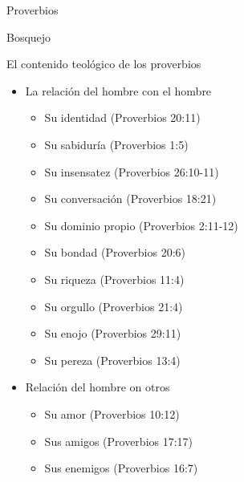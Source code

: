 \begin{section}{Proverbios}
\begin{subsection}{Bosquejo}
\begin{subsubsection}{El contenido teológico de los proverbios}
\begin{itemize}
						\newpage
						También hay una utilidad en estudiar los proverbios de manera temática ya que vemos la relación que el hombre guarda con Dios.\\
						La relación del hombre con Dios
						\begin{itemize}
							\item Su confianza (Proverbios 22:19)
							\item Su humildad (Proverbios 3:34)
							\item Su temor a Dios (Proverbios 1:7)
							\item Su justicia (Proverbios 10:25)
							\item Su pecado (Proverbios 28:13)
							\item Su obediencia (Proverbios 12:15)
							\item Enfrentando recompensa (Proverbios 11:31)
							\item Enfrentado pruebas (Proverbios 17:3)
							\item Enfrentando bendición (Proverbios 10:22)
							\item Enfrentando la muerte (Proverbios 15:11)
						\end{itemize}
					\item La relación del hombre con el hombre
						\begin{itemize}
							\item Su identidad (Proverbios 20:11)
							\item Su sabiduría (Proverbios 1:5)
							\item Su insensatez (Proverbios 26:10-11)
							\item Su conversación (Proverbios 18:21)
							\item Su dominio propio (Proverbios 2:11-12)
							\item Su bondad (Proverbios 20:6)
							\item Su riqueza (Proverbios 11:4)
							\item Su orgullo (Proverbios 21:4)
							\item Su enojo (Proverbios 29:11)
							\item Su pereza (Proverbios 13:4)
						\end{itemize}
					\item Relación del hombre on otros
						\begin{itemize}
							\item Su amor (Proverbios 10:12)
							\item Sus amigos (Proverbios 17:17)
							\item Sus enemigos (Proverbios 16:7)

\end{itemize}
\end{itemize}
\end{subsubsection}
\end{subsection}
\end{section}
